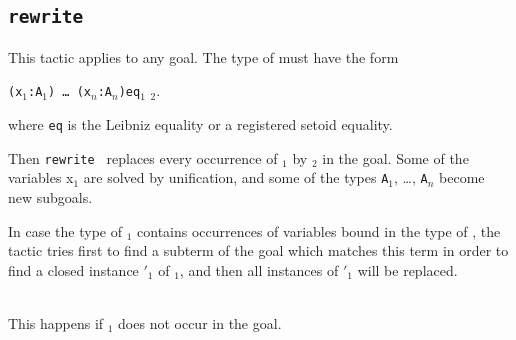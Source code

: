 \subsection{\tt rewrite \term
\label{rewrite}
}

This tactic applies to any goal. The type of {\term}
must have the form

\texttt{(x$_1$:A$_1$) \dots\ (x$_n$:A$_n$)}\texttt{eq}\term$_1$ \term$_2$. 

\noindent where \texttt{eq} is the Leibniz equality or a registered
setoid equality.

\noindent Then {\tt rewrite \term} replaces every occurrence of 
\term$_1$ by \term$_2$ in the goal. Some of the variables x$_1$ are
solved by unification, and some of the types \texttt{A}$_1$, \dots,
\texttt{A}$_n$ become new subgoals.

\Rem In case the type of  
\term$_1$ contains occurrences of variables bound in the
type of \term, the tactic tries first to find a subterm of the goal
which matches this term in order to find a closed instance \term$'_1$
of \term$_1$, and then all instances of \term$'_1$ will be replaced.

\begin{ErrMsgs}
\item {}

\item {}\\
This happens if \term$_1$ does not occur in the goal.
\end{ErrMsgs}

